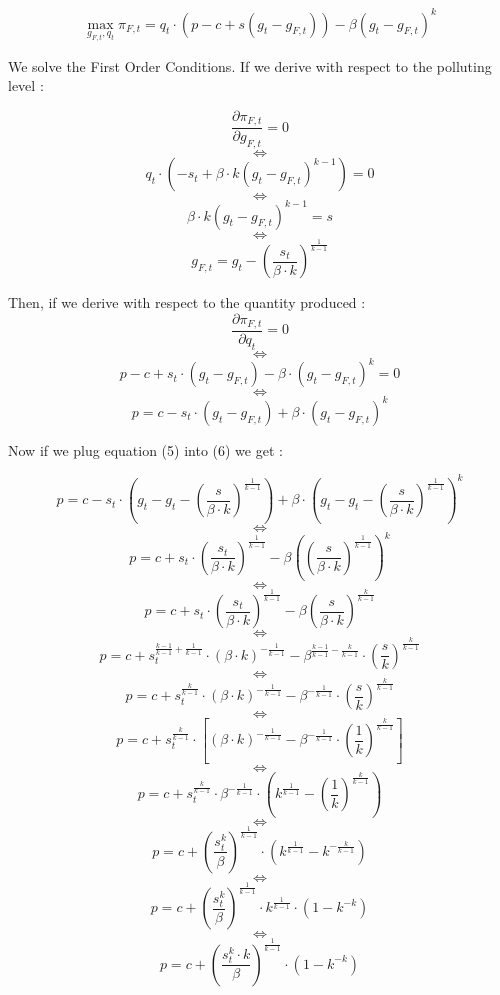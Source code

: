 \documentclass{article}
\begin{document}
$$ \max_{g_{F,t},q_{t}}{\pi_{F,t}=q_{t}\cdot\left(p-c+s(g_{t}-g_{F,t})\right)-\beta(g_{t}-g_{F,t})^{k}}$$

We solve the First Order Conditions. If we derive with respect to the polluting level : 

$$\frac{\partial \pi_{F,t}}{\partial g_{F,t}}=0$$
$$\iff$$
$$q_t\cdot(-s_{t}+\beta\cdot k(g_{t}-g_{F,t})^{k-1})=0$$
$$\iff$$
$$\beta\cdot k(g_{t}-g_{F,t})^{k-1}=s$$
$$\iff$$
\begin{equation}
    g_{F,t}=g_{t}-\left(\frac{s_{t}}{\beta\cdot k}\right)^{\frac{1}{k-1}}
\end{equation}

Then, if we derive with respect to the quantity produced :
$$\frac{\partial \pi_{F,t}}{\partial q_{t}}=0$$
$$\iff$$
$$p-c+s_{t}\cdot(g_{t}-g_{F,t})-\beta\cdot(g_{t}-g_{F,t})^{k}=0$$
$$\iff$$
\begin{equation}
    p=c-s_{t}\cdot(g_{t}-g_{F,t})+\beta\cdot(g_{t}-g_{F,t})^{k} 
\end{equation}

Now if we plug equation (5) into (6) we get : 

$$ p=c-s_{t}\cdot\left(g_{t}-g_{t}-\left(\frac{s}{\beta\cdot k}\right)^{\frac{1}{k-1}}\right)+\beta\cdot\left(g_{t}-g_{t}-\left(\frac{s}{\beta\cdot k}\right)^{\frac{1}{k-1}}\right)^{k}$$
$$\iff$$
$$p=c+s_{t}\cdot\left(\frac{s_{t}}{\beta\cdot k}\right)^{\frac{1}{k-1}}-\beta\left(\left(\frac{s}{\beta\cdot k}\right)^{\frac{1}{k-1}}\right)^{k}$$
$$\iff$$
$$p=c+s_{t}\cdot\left(\frac{s_{t}}{\beta\cdot k}\right)^{\frac{1}{k-1}}-\beta\left(\frac{s}{\beta\cdot k}\right)^{\frac{k}{k-1}}$$
$$\iff$$
$$p=c+s_{t}^{\frac{k-1}{k-1}+\frac{1}{k-1}}\cdot\left({\beta\cdot k}\right)^{-\frac{1}{k-1}}-\beta^{\frac{k-1}{k-1}-\frac{k}{k-1}}\cdot\left(\frac{s}{k}\right)^{\frac{k}{k-1}}$$
$$\iff$$
$$p=c+s_{t}^{\frac{k}{k-1}}\cdot\left({\beta\cdot k}\right)^{-\frac{1}{k-1}}-\beta^{-\frac{1}{k-1}}\cdot\left(\frac{s}{k}\right)^{\frac{k}{k-1}}$$
$$\iff$$
$$p=c+s_{t}^{\frac{k}{k-1}}\cdot\left[\left({\beta\cdot k}\right)^{-\frac{1}{k-1}}-\beta^{-\frac{1}{k-1}}\cdot\left(\frac{1}{k}\right)^{\frac{k}{k-1}}\right]$$
$$\iff$$
$$p=c+s_{t}^{\frac{k}{k-1}}\cdot{\beta}^{-\frac{1}{k-1}}\cdot\left(k^{\frac{1}{k-1}}-\left(\frac{1}{k}\right)^{\frac{k}{k-1}}\right)$$
$$\iff$$
$$p=c+\left(\frac{s_{t}^k}{\beta}\right)^{\frac{1}{k-1}}\cdot\left(k^{\frac{1}{k-1}}-{k}^{-\frac{k}{k-1}}\right)$$
$$\iff$$
$$p=c+\left(\frac{s_{t}^k}{\beta}\right)^{\frac{1}{k-1}}\cdot{k}^{\frac{1}{k-1}}\cdot\left(1-{k}^{-k}\right)$$
$$\iff$$
\begin{equation}
    p=c+\left(\frac{s_{t}^k\cdot k}{\beta}\right)^{\frac{1}{k-1}}\cdot\left(1-{k}^{-k}\right)
\end{equation}
\end{document}
